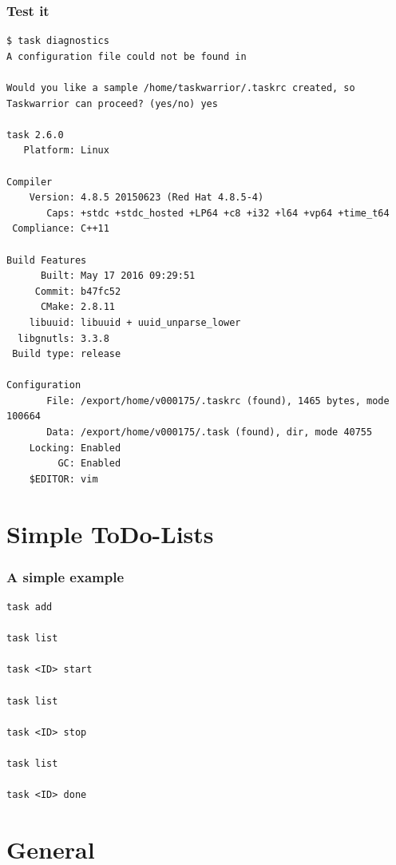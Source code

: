 \documentclass[t,handout]{beamer}
\begin{document}
\begin{frame}[fragile]\frametitle{Test it}
    \vfill %
    \begin{lstlisting}
$ task diagnostics
A configuration file could not be found in

Would you like a sample /home/taskwarrior/.taskrc created, so Taskwarrior can proceed? (yes/no) yes

task 2.6.0
   Platform: Linux

Compiler
    Version: 4.8.5 20150623 (Red Hat 4.8.5-4)
       Caps: +stdc +stdc_hosted +LP64 +c8 +i32 +l64 +vp64 +time_t64
 Compliance: C++11

Build Features
      Built: May 17 2016 09:29:51
     Commit: b47fc52
      CMake: 2.8.11
    libuuid: libuuid + uuid_unparse_lower
  libgnutls: 3.3.8
 Build type: release

Configuration
       File: /export/home/v000175/.taskrc (found), 1465 bytes, mode 100664
       Data: /export/home/v000175/.task (found), dir, mode 40755
    Locking: Enabled
         GC: Enabled
    $EDITOR: vim\end{lstlisting}
\end{frame}


\section{Simple ToDo-Lists}

\begin{frame}[fragile]\frametitle{A simple example}
    \vfill
    \begin{lstlisting}
task add

task list

task <ID> start

task list

task <ID> stop

task list

task <ID> done\end{lstlisting}
\end{frame}

\section{General}
\end{document}
